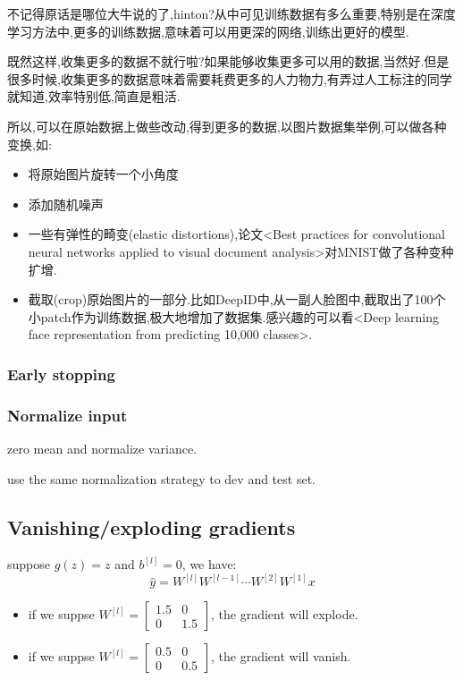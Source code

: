 不记得原话是哪位大牛说的了,hinton?从中可见训练数据有多么重要,特别是在深度学习方法中,更多的训练数据,意味着可以用更深的网络,训练出更好的模型.

既然这样,收集更多的数据不就行啦?如果能够收集更多可以用的数据,当然好.但是很多时候,收集更多的数据意味着需要耗费更多的人力物力,有弄过人工标注的同学就知道,效率特别低,简直是粗活.

所以,可以在原始数据上做些改动,得到更多的数据,以图片数据集举例,可以做各种变换,如:
\begin{itemize}
\item 将原始图片旋转一个小角度
\item 添加随机噪声
\item 一些有弹性的畸变(elastic distortions),论文<Best practices for convolutional neural networks applied to visual document analysis>对MNIST做了各种变种扩增.
\item 截取(crop)原始图片的一部分.比如DeepID中,从一副人脸图中,截取出了100个小patch作为训练数据,极大地增加了数据集.感兴趣的可以看<Deep learning face representation from predicting 10,000 classes>.
\end{itemize}

\subsubsection{Early stopping}

\subsubsection{Normalize input}
zero mean and normalize variance.

use the same normalization strategy to dev and test set.

\subsection{Vanishing/exploding gradients}
suppose $g(z) = z$ and $b^{[l]} = 0$, we have:
$$\hat{y} = W^{[l]} W^{[l - 1]} \cdots W^{[2]} W^{[1]} x$$
\begin{itemize}
\item if we suppse $W^{[l]} = \begin{bmatrix}1.5 & 0 \\ 0 & 1.5\end{bmatrix}$, the gradient will explode.
\item if we suppse $W^{[l]} = \begin{bmatrix}0.5 & 0 \\ 0 & 0.5\end{bmatrix}$, the gradient will vanish.
\end{itemize}

